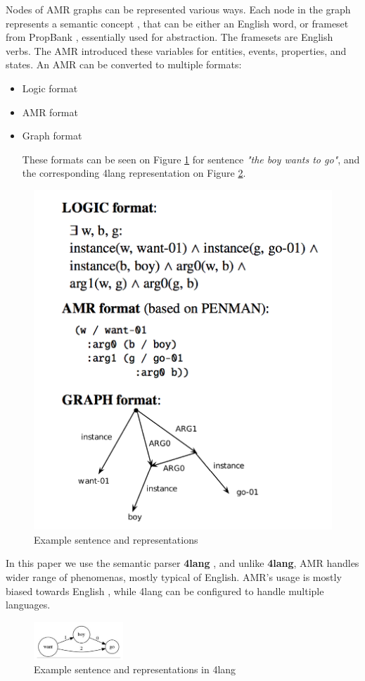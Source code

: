 Nodes of AMR graphs can be represented various ways. Each node in the graph represents a semantic concept \cite{AMR:2015}, that can be either an English word, or frameset from PropBank \cite{Palmer:2005}, essentially used for abstraction. The framesets are English verbs. The AMR introduced these variables for entities, events, properties, and states. An AMR can be converted to multiple formats:
\begin{itemize}
	\item Logic format
	\item AMR format
	\item Graph format
	
	These formats can be seen on Figure \ref{fig:amr} for sentence \textit{"the boy wants to go"}, and the corresponding 4lang representation on Figure \ref{fig:4langboy}.
	
\end{itemize}

\begin{figure}[h!]
	\centering
	\includegraphics[height=0.4\textwidth]{figures/amr}
	\caption{Example sentence and representations}
	\label{fig:amr}
\end{figure}

In this paper we use the semantic parser \textbf{4lang} \cite{Recski:2018}, and unlike \textbf{4lang}, AMR handles wider range of phenomenas, mostly typical of English. AMR's usage is mostly biased towards English \cite{Palmer:2005}, while 4lang can be configured to handle multiple languages.

\begin{figure}[h!]
	\centering
	\includegraphics[width=0.3\textwidth]{figures/4langboy}
	\caption{Example sentence and representations in 4lang}
	\label{fig:4langboy}
\end{figure}

